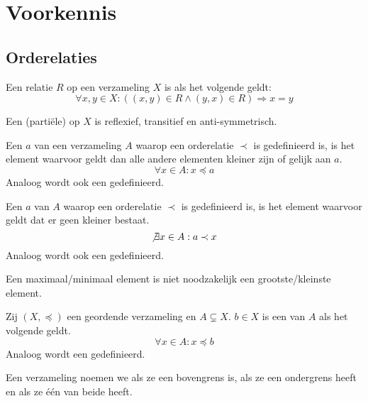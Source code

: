 \documentclass[main.tex]{subfiles}
\begin{document}
\chapter{Voorkennis}
\label{cha:voorkennis}

\section{Orderelaties}
\label{sec:orderelaties}


\begin{de}
  Een relatie $R$ op een verzameling $X$ is  als het volgende geldt:
  \[ \forall x,y \in X: ((x,y) \in R \wedge (y,x) \in R) \Rightarrow x = y \]
\end{de}

\begin{de}
  Een (parti\"ele)  op $X$ is reflexief, transitief en anti-symmetrisch.
\end{de}

\begin{de}
  Een  $a$ van een verzameling $A$ waarop een orderelatie $\prec$ is gedefinieerd is, is het element waarvoor geldt dan alle andere elementen kleiner zijn of gelijk aan $a$.
  \[ \forall x \in A: x \preceq a \] 
  Analoog wordt ook een  gedefinieerd.
\end{de}

\begin{de}
  Een  $a$ van $A$ waarop een orderelatie $\prec$ is gedefinieerd is, is het element waarvoor geldt dat er geen kleiner bestaat.
  \[ \not\exists x \in A: a \prec x \]
  Analoog wordt ook een  gedefinieerd.
\end{de}

\begin{opm}
  Een maximaal/minimaal element is niet noodzakelijk een grootste/kleinste element.    
\end{opm}

\begin{de}
  Zij $(X,\preceq)$ een geordende verzameling en $A \subsetneq X$.
  $b \in X$ is een  van $A$ als het volgende geldt.
  \[ \forall x \in A: x \preceq b \]
  Analoog wordt een  gedefinieerd.
\end{de}

\begin{de}
  Een verzameling noemen we  als ze een bovengrens is,  als ze een ondergrens heeft en  als ze \'e\'en van beide heeft.
\end{de}
\end{document}
